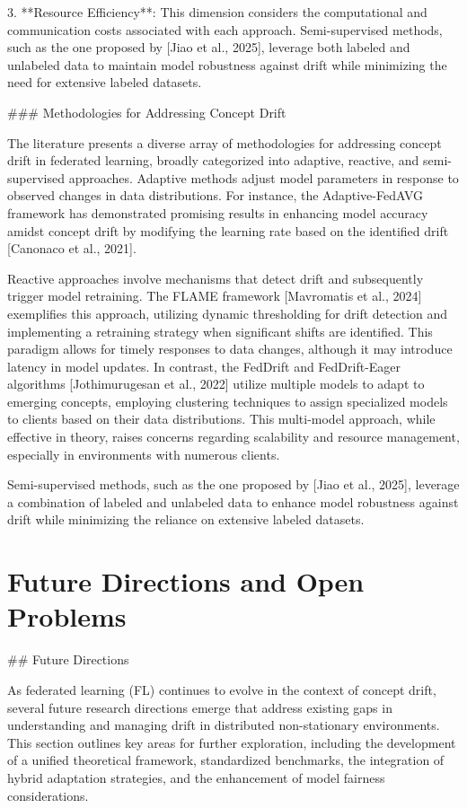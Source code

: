 \documentclass[journal]{IEEEtran}
\begin{document}
3. **Resource Efficiency**: This dimension considers the computational and communication costs associated with each approach. Semi-supervised methods, such as the one proposed by [Jiao et al., 2025], leverage both labeled and unlabeled data to maintain model robustness against drift while minimizing the need for extensive labeled datasets.

\#\#\# Methodologies for Addressing Concept Drift

The literature presents a diverse array of methodologies for addressing concept drift in federated learning, broadly categorized into adaptive, reactive, and semi-supervised approaches. Adaptive methods adjust model parameters in response to observed changes in data distributions. For instance, the Adaptive-FedAVG framework has demonstrated promising results in enhancing model accuracy amidst concept drift by modifying the learning rate based on the identified drift [Canonaco et al., 2021].

Reactive approaches involve mechanisms that detect drift and subsequently trigger model retraining. The FLAME framework [Mavromatis et al., 2024] exemplifies this approach, utilizing dynamic thresholding for drift detection and implementing a retraining strategy when significant shifts are identified. This paradigm allows for timely responses to data changes, although it may introduce latency in model updates. In contrast, the FedDrift and FedDrift-Eager algorithms [Jothimurugesan et al., 2022] utilize multiple models to adapt to emerging concepts, employing clustering techniques to assign specialized models to clients based on their data distributions. This multi-model approach, while effective in theory, raises concerns regarding scalability and resource management, especially in environments with numerous clients.

Semi-supervised methods, such as the one proposed by [Jiao et al., 2025], leverage a combination of labeled and unlabeled data to enhance model robustness against drift while minimizing the reliance on extensive labeled datasets.

\section{Future Directions and Open Problems}
\label{sec:future_directions}

\#\# Future Directions

As federated learning (FL) continues to evolve in the context of concept drift, several future research directions emerge that address existing gaps in understanding and managing drift in distributed non-stationary environments. This section outlines key areas for further exploration, including the development of a unified theoretical framework, standardized benchmarks, the integration of hybrid adaptation strategies, and the enhancement of model fairness considerations.
\end{document}

